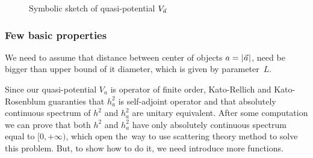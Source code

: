 \documentclass[10pt,t]{beamer}
\begin{document}
\begin{frame}
\begin{figure}

    \caption{Symbolic sketch of quasi-potential $V_{ \vec{a} }$}


  \end{figure}

\end{frame}





\begin{frame}
  \frametitle{Few basic properties}


  We need to assume that distance between center of objects
  $a = | \hspace{0.05em}  \vec{a}  \hspace{0.05em} |$, need be bigger than upper bound of it diameter,
  which is given by parameter~$L$.

  Since our quasi-potential $V_{ a }$ is operator of finite order,
  Kato-Rellich and Kato-Rosenblum guaranties that $h_{ a }^{ 2 }$ is
  self-adjoint operator and that absolutely continuous spectrum of
  $h^{ 2 }$ and $h_{ a }^{ 2 }$ are unitary equivalent. After some
  computation we can prove that both $h^{ 2 }$ and $h_{ a }^{ 2 }$ have only
  absolutely continuous spectrum equal to $[ 0, +\infty )$, which open
  the~way to use scattering theory method to solve this problem. But,
  to show how to do it, we need introduce more functions.

\end{frame}
\end{document}
